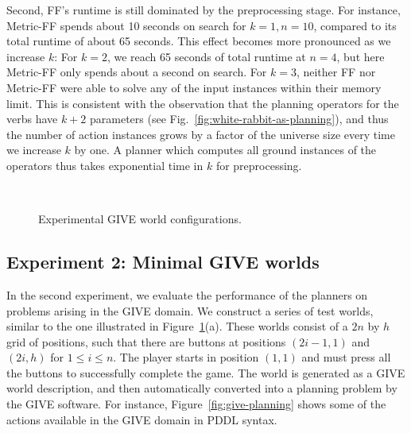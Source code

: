 Second, FF's runtime is still dominated by the preprocessing
stage. For instance, Metric-FF spends about 10 seconds on search for
$k=1,n=10$, compared to its total runtime of about 65 seconds. This
effect becomes more pronounced as we increase $k$: For $k=2$, we reach
65 seconds of total runtime at $n=4$, but here Metric-FF only spends
about a second on search. For $k=3$, neither FF nor Metric-FF were
able to solve any of the input instances within their memory
limit. This is consistent with the observation that the planning
operators for the verbs have $k+2$ parameters (see
Fig.~\ref{fig:white-rabbit-as-planning}), and thus the number of
action instances grows by a factor of the universe size every time we
increase $k$ by one. A planner which computes all ground instances of
the operators thus takes exponential time in $k$ for preprocessing.

\begin{figure}[t]
  \centering
  \qquad
   \\
  \caption{Experimental GIVE world configurations.}
  \label{fig:give-maps}
\end{figure}


\subsection{Experiment 2: Minimal GIVE worlds}
\label{sec:exper-2:-minim}

In the second experiment, we evaluate the performance of the planners on
problems arising in the GIVE domain. We construct a series of test worlds,
similar to the one illustrated in Figure~\ref{fig:give-maps}(a). These
worlds consist of a $2n$ by $h$ grid of positions, such that there are
buttons at positions $(2i-1,1)$ and $(2i,h)$ for $1 \leq i \leq n$. The
player starts in position $(1,1)$ and must press all the buttons
to successfully complete the game. The world is generated as a GIVE world
description, and then automatically converted into a planning problem by
the GIVE software. For instance, Figure~\ref{fig:give-planning} shows some
of the actions available in the GIVE domain in PDDL syntax.

